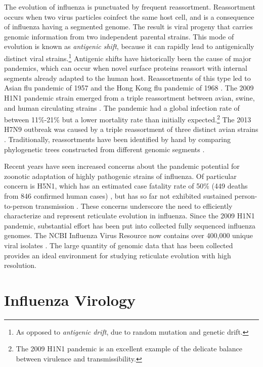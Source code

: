 The evolution of influenza is punctuated by frequent reassortment.
Reassortment occurs when two virus particles coinfect the same host cell, and is a consequence of influenza having a segmented genome.
The result is viral progeny that carries genomic information from two independent parental strains.
This mode of evolution is known as \emph{antigenic shift}, because it can rapidly lead to antigenically distinct viral strains.\footnote{As opposed to \emph{antigenic drift}, due to random mutation and genetic drift.}
Antigenic shifts have historically been the cause of major pandemics, which can occur when novel surface proteins reassort with internal segments already adapted to the human host.
Reassortments of this type led to Asian flu pandemic of 1957 and the Hong Kong flu pandemic of 1968 \cite{Lindstrom:2004il}.
The 2009 H1N1 pandemic strain emerged from a triple reassortment between avian, swine, and human circulating strains \cite{Hernandez:2011ud,Smith:2009io}.
The pandemic had a global infection rate of between 11\%-21\% but a lower mortality rate than initially expected.\footnote{The 2009 H1N1 pandemic is an excellent example of the delicate balance between virulence and transmissibility.}
The 2013 H7N9 outbreak was caused by a triple reassortment of three distinct avian strains \cite{Chen:2013kp}.
Traditionally, reassortments have been identified by hand by comparing phylogenetic trees constructed from different genomic segments \cite{Nelson:2006bx}.

Recent years have seen increased concerns about the pandemic potential for zoonotic adaptation of highly pathogenic strains of influenza.
Of particular concern is H5N1, which has an estimated case fatality rate of 50\% (449 deaths from 846 confirmed human cases) \cite{WHO:2016a}, but has so far not exhibited sustained person-to-person transmission \cite{WHO:2014b}.
These concerns underscore the need to efficiently characterize and represent reticulate evolution in influenza.
Since the 2009 H1N1 pandemic, substantial effort has been put into collected fully sequenced influenza genomes.
The NCBI Influenza Virus Resource now contains over 400,000 unique viral isolates \cite{Bao:2008cq}.
The large quantity of genomic data that has been collected provides an ideal environment for studying reticulate evolution with high resolution.

\section{Influenza Virology}
\label{flu:virology}

